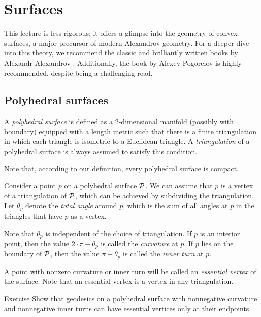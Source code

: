 \chapter{Surfaces}\label{chap:surfaces}

This lecture is less rigorous; it offers a glimpse into the geometry of convex surfaces, a major precursor of modern Alexandrov geometry.
For a deeper dive into this theory, we recommend the classic and brilliantly written books by Alexandr Alexandrov \cite{alexandrov, alexandrov-1948}.
Additionally, the book by Alexey Pogorelov \cite{pogorelov1969} is highly recommended, despite being a challenging read.


\section{Polyhedral surfaces}

A \emph{polyhedral surface} is defined as a 2-dimensional manifold (possibly with boundary) equipped with a length metric such that there is a finite triangulation in which each triangle is isometric to a Euclidean triangle.
A \emph{triangulation} of a polyhedral surface is always assumed to satisfy this condition.

Note that, according to our definition, every polyhedral surface is compact.

Consider a point $p$ on a polyhedral surface $\mathcal{P}$.
We can assume that $p$ is a vertex of a triangulation of $\mathcal{P}$,
which can be achieved by subdividing the triangulation.
Let $\theta_p$ denote the {}\emph{total angle} around $p$, which is the sum of all angles at $p$ in the triangles that have $p$ as a vertex.

Note that $\theta_p$ is independent of the choice of triangulation.
If $p$ is an interior point, then the value $2\cdot\pi-\theta_p$ is called the \emph{curvature} at $p$.
If $p$ lies on the boundary of $\mathcal{P}$, then the value $\pi-\theta_p$ is called the \emph{inner turn} at $p$.

A point with nonzero curvature or inner turn will be called an \emph{essential vertex} of the surface.
Note that an essential vertex is a vertex in any triangulation.

\begin{thm}[!]{Exercise}\label{ex:geodesic-vertex}
Show that geodesics on a polyhedral surface with nonnegative curvature and nonnegative inner turns can have essential vertices only at their endpoints.
\end{thm}

